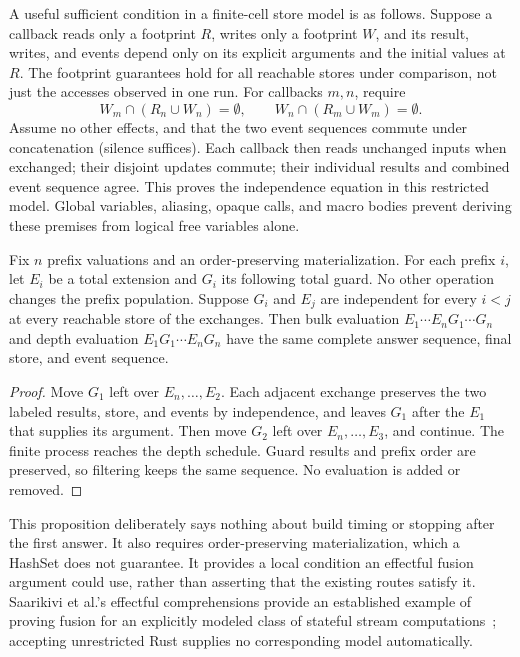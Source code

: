 A useful sufficient condition in a finite-cell store model is as follows.
Suppose a callback reads only a footprint $R$, writes only a footprint $W$,
and its result, writes, and events depend only on its explicit arguments and
the initial values at $R$. The footprint guarantees hold for all reachable
stores under comparison, not just the accesses observed in one run. For
callbacks $m,n$, require
\[
 W_m\cap(R_n\cup W_n)=\emptyset,
 \qquad W_n\cap(R_m\cup W_m)=\emptyset.
\]
Assume no other effects, and that the two event sequences commute under
concatenation (silence suffices). Each callback then reads unchanged inputs
when exchanged; their disjoint updates commute; their individual results and
combined event sequence agree. This proves the independence equation in this
restricted model. Global variables, aliasing, opaque calls, and macro bodies
prevent deriving these premises from logical free variables alone.

\begin{proposition}
\label{prop:interchange}
Fix $n$ prefix valuations and an order-preserving materialization. For each
prefix $i$, let $E_i$ be a total extension and $G_i$ its following total guard.
No other operation changes the prefix population. Suppose $G_i$ and $E_j$
are independent for every $i<j$ at every reachable store of the exchanges.
Then bulk evaluation $E_1\cdots E_nG_1\cdots G_n$ and depth evaluation
$E_1G_1\cdots E_nG_n$ have the same complete answer sequence, final store,
and event sequence.
\end{proposition}
\begin{proof}
Move $G_1$ left over $E_n,\ldots,E_2$. Each adjacent exchange preserves
the two labeled results, store, and events by independence, and leaves $G_1$
after the $E_1$ that supplies its argument. Then move $G_2$ left over
$E_n,\ldots,E_3$, and continue. The finite process reaches the depth schedule.
Guard results and prefix order are preserved, so filtering keeps the same
sequence. No evaluation is added or removed.
\end{proof}
This proposition deliberately says nothing about build timing or stopping
after the first answer. It also requires order-preserving materialization,
which a HashSet does not guarantee. It provides a local condition an effectful
fusion argument could use, rather than asserting that the existing routes
satisfy it. Saarikivi et al.'s effectful comprehensions provide an established
example of proving fusion for an explicitly modeled class of stateful stream
computations~\cite{prov-fusion}; accepting unrestricted Rust supplies no
corresponding model automatically.

